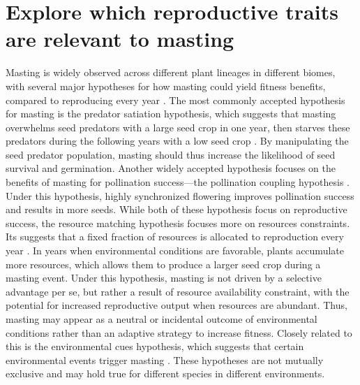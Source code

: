 \documentclass[11pt,letter]{article}
\begin{document}
\section{Explore which reproductive traits are relevant to masting}
Masting is widely observed across different plant lineages in different biomes, with several major hypotheses for how masting could yield fitness benefits, compared to reproducing every year \citep{koenig2021brief, waller1979models}. The most commonly accepted hypothesis for masting is the predator satiation hypothesis, which suggests that masting overwhelms seed predators with a large seed crop in one year, then starves these predators during the following years with a low seed crop \citep{janzen1971seed}. By manipulating the seed predator population, masting should thus increase the likelihood of seed survival and germination. Another widely accepted hypothesis focuses on the benefits of masting for pollination success---the pollination coupling hypothesis \citep{crone2014resource}. Under this hypothesis, highly synchronized flowering improves pollination success and results in more seeds. While both of these hypothesis focus on reproductive success, the resource matching hypothesis focuses more on resources constraints. Its suggests that a fixed fraction of resources is allocated to reproduction every year \citep{kelly1994evolutionary}. In years when environmental conditions are favorable, plants accumulate more resources, which allows them to produce a larger seed crop during a masting event. Under this hypothesis, masting is not driven by a selective advantage per se, but rather a result of resource availability constraint, with the potential for increased reproductive output when resources are abundant. Thus, masting may appear as a neutral or incidental outcome of environmental conditions rather than an adaptive strategy to increase fitness. Closely related to this is the environmental cues hypothesis, which suggests that certain environmental events trigger masting \citep{pearse2016mechanisms}. These hypotheses are not mutually exclusive and may hold true for different species in different environments.\par
\end{document}
